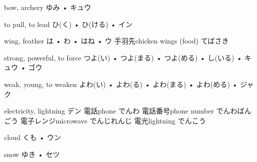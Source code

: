 



\setcounter{cardnum}{25}

		{bow, archery}
		{ゆみ • キュウ}
		{}{}
		{}{}
		{}{}
		{}{}
		{}{}

		{to pull, to lead}
		{ひ(く) • ひ(ける) • イン}
		{}{}
		{}{}
		{}{}
		{}{}
		{}{}

		{wing, feather}
		{は • わ • はね • ウ}
		{手羽先}{chicken wings (food) てばさき}
		{}{}
		{}{}
		{}{}
		{}{}

		{strong, powerful, to force}
		{つよ(い) • つよ(まる) • つよ(める) • し(いる) • キュウ • ゴウ}
		{}{}
		{}{}
		{}{}
		{}{}
		{}{}

		{weak, young, to weaken}
		{よわ(い) • よわ(る) • よわ(まる) • よわ(める) • ジャク}
		{}{}
		{}{}
		{}{}
		{}{}
		{}{}

		{electricity, lightning}
		{デン}
		{電話}{phone でんわ}
		{電話番号}{phone number でんわばんごう}
		{電子レンジ}{microwave でんじれんじ}
		{電光}{lightning でんこう}
		{}{}

		{cloud}
		{くも • ウン}
		{}{}
		{}{}
		{}{}
		{}{}
		{}{}

		{snow}
		{ゆき • セツ}
		{}{}
		{}{}
		{}{}
		{}{}
		{}{}

